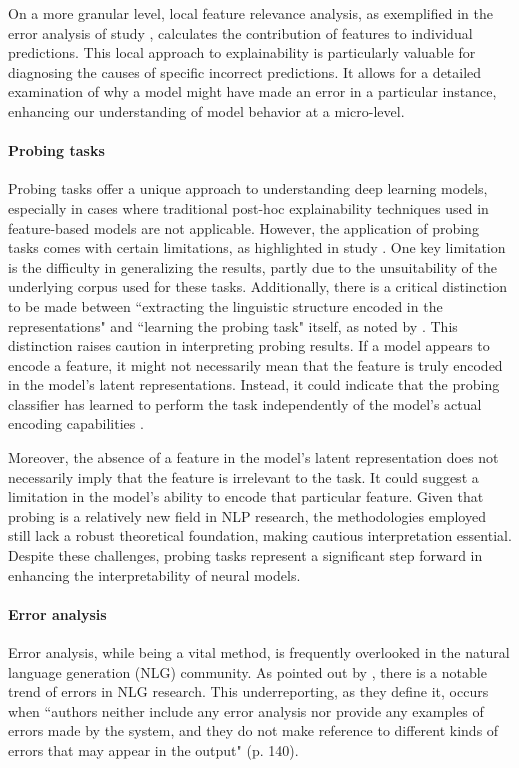 On a more granular level, local feature relevance analysis, as exemplified in the error analysis of study \studE, calculates the contribution of features to individual predictions. This local approach to explainability is particularly valuable for diagnosing the causes of specific incorrect predictions. It allows for a detailed examination of why a model might have made an error in a particular instance, enhancing our understanding of model behavior at a micro-level.

\paragraph*{Probing tasks}

Probing tasks offer a unique approach to understanding deep learning models, especially in cases where traditional post-hoc explainability techniques used in feature-based models are not applicable. However, the application of probing tasks comes with certain limitations, as highlighted in study \studG. One key limitation is the difficulty in generalizing the results, partly due to the unsuitability of the underlying corpus used for these tasks. Additionally, there is a critical distinction to be made between ``extracting the linguistic structure encoded in the representations" and ``learning the probing task" itself, as noted by \citet[5136]{kunz-kuhlmann-2020-classifier}. This distinction raises caution in interpreting probing results. If a model appears to encode a feature, it might not necessarily mean that the feature is truly encoded in the model's latent representations. Instead, it could indicate that the probing classifier has learned to perform the task independently of the model's actual encoding capabilities \citep{kunz-kuhlmann-2020-classifier}. 

Moreover, the absence of a feature in the model's latent representation does not necessarily imply that the feature is irrelevant to the task. It could suggest a limitation in the model’s ability to encode that particular feature. Given that probing is a relatively new field in NLP research, the methodologies employed still lack a robust theoretical foundation, making cautious interpretation essential. Despite these challenges, probing tasks represent a significant step forward in enhancing the interpretability of neural models.

\paragraph*{Error analysis} 
Error analysis, while being a vital method, is frequently overlooked in the natural language generation (NLG) community. As pointed out by \citet{van-miltenburg-etal-2021-underreporting}, there is a notable trend of  errors in NLG research. This underreporting, as they define it, occurs when ``authors neither include any error analysis nor provide any examples of errors made by the system, and they do not make reference
to different kinds of errors that may appear in
the output" (p. 140).


